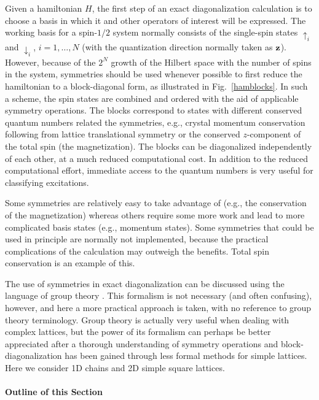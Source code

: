 \documentclass[draft,numberedheadings]{aipproc}
\newcommand{\dn}{\downarrow}
\newcommand{\up}{\uparrow}
\begin{document}
Given a hamiltonian $H$, the first step of an exact diagonalization calculation is to choose a basis in which it and other operators of interest will be expressed. 
The working basis for a spin-$1/2$ system normally consists of the single-spin states $\up_i$ and $\dn_i$, $i=1,\ldots,N$ (with the quantization direction normally taken 
as ${\bf z}$). However, because of 
the $2^N$ growth of the Hilbert space with the number of spins in the system, symmetries should be used whenever possible to first reduce the hamiltonian to 
a block-diagonal form, as illustrated in Fig.~\ref{hamblocks}. In such a scheme, the spin states are combined and ordered with the aid of applicable symmetry 
operations. The  blocks correspond to states with different conserved quantum numbers related the symmetries, e.g., crystal momentum conservation following from lattice 
translational symmetry or the conserved $z$-component of the total spin (the magnetization). The blocks can be diagonalized independently of each other, at a 
much reduced computational cost. In addition to the reduced computational effort, immediate access to the quantum numbers is very useful for classifying 
excitations. 

Some symmetries are relatively easy to take advantage of (e.g., the conservation of the magnetization) whereas others require some more work 
and lead to more complicated basis states (e.g., momentum states). Some symmetries that could be used in principle are normally not implemented, because the practical 
complications of the calculation may outweigh the benefits. Total spin conservation is an example of this.

The use of symmetries in exact diagonalization can be discussed using the language of group theory \cite{didier}. This formalism is not necessary (and often 
confusing), however, and here a more practical approach is taken, with no reference to group theory terminology. Group theory is actually very useful when dealing with 
complex lattices, but the power of its formalism can perhaps be better appreciated after a thorough understanding of symmetry operations and block-diagonalization 
has been gained through less formal methods for simple lattices. Here we consider 1D chains and 2D simple square lattices.

\paragraph{Outline of this Section}
\end{document}
